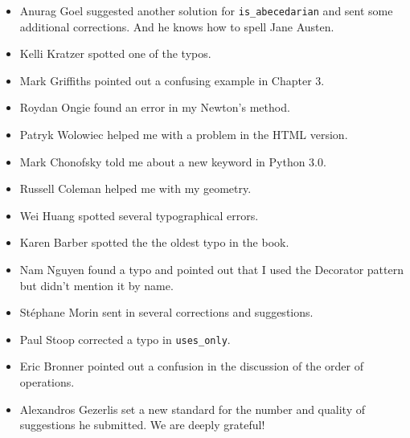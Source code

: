 \documentclass[10pt]{book}
\begin{document}
\begin{itemize}
\item Anurag Goel suggested another solution for \verb"is_abecedarian"
and sent some additional corrections.  And he knows how to
spell Jane Austen.

\item Kelli Kratzer spotted one of the typos.

\item Mark Griffiths pointed out a confusing example in Chapter 3.

\item Roydan Ongie found an error in my Newton's method.

\item Patryk Wolowiec helped me with a problem in the HTML version.

\item Mark Chonofsky told me about a new keyword in Python 3.0.

\item Russell Coleman helped me with my geometry.

\item Wei Huang spotted several typographical errors.

\item Karen Barber spotted the the oldest typo in the book.

\item Nam Nguyen found a typo and pointed out that I used the Decorator
pattern but didn't mention it by name.

\item St\'{e}phane Morin sent in several corrections and suggestions.

\item Paul Stoop corrected a typo in \verb+uses_only+.

\item Eric Bronner pointed out a confusion in the discussion of the
order of operations.

\item Alexandros Gezerlis set a new standard for the number and
quality of suggestions he submitted.  We are deeply grateful!


\end{itemize}


\normalsize
\clearemptydoublepage

\begin{latexonly}

\tableofcontents

\clearemptydoublepage

\end{latexonly}
\end{document}
